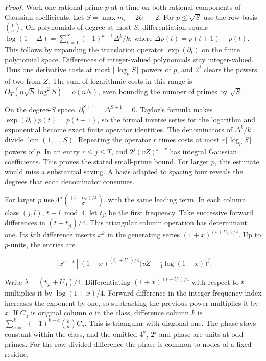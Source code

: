 \documentclass[11pt,a4paper]{article}
\begin{document}
\emph{Proof.} Work one rational prime \(p\) at a time on both rational components of Gaussian coefficients. Let \(S=\max m_v+2U_0+2\). For \(p\le\sqrt S\) use the row basis \(\binom t\sigma\). On polynomials of degree at most \(S\), differentiation equals \(\log(1+\Delta)=\sum_{k=1}^S(-1)^{k-1}\Delta^k/k\), where \(\Delta p(t)=p(t+1)-p(t)\). This follows by expanding the translation operator \(\exp(\partial_t)\) on the finite polynomial space. Differences of integer-valued polynomials stay integer-valued. Thus one derivative costs at most \(\lfloor\log_p S\rfloor\) powers of \(p\), and \(2^j\) clears the powers of two from \(Z\). The sum of logarithmic costs in this range is \(O_T(n\sqrt S\log^2 S)=o(nN)\), even bounding the number of primes by \(\sqrt S\).

On the degree-\(S\) space, \(\partial_t^{S+1}=\Delta^{S+1}=0\). Taylor's formula makes \(\exp(\partial_t)p(t)=p(t+1)\), so the formal inverse series for the logarithm and exponential become exact finite operator identities. The denominators of \(\Delta^k/k\) divide \(\operatorname{lcm}(1,\ldots,S)\). Repeating the operator \(r\) times costs at most \(r\lfloor\log_p S\rfloor\) powers of \(p\). In an entry \(r\le j\le T\), and \(2^j(vZ)^{j-r}\) has integral Gaussian coefficients. This proves the stated small-prime bound. For larger \(p\), this estimate would miss a substantial saving. A basis adapted to spacing four reveals the degrees that each denominator consumes.

For larger \(p\) use \(4^\sigma\binom{(t+U_0)/4}{\sigma}\), with the same leading term. In each column class \((j,l)\), \(t\equiv l\bmod4\), let \(t_{jl}\) be the first frequency. Take successive forward differences in \((t-t_{jl})/4\). This triangular column operation has determinant one. Its \(k\)th difference inserts \(x^k\) in the generating series \((1+x)^{(t+U_0)/4}\). Up to \(p\)-units, the entries are

\[
 [x^{\sigma-k}](1+x)^{(t_{jl}+U_0)/4}
        \big(vZ+\tfrac14\log(1+x)\big)^j .                               \tag{10}\label{eq:10}
\]

Write \(\lambda=(t_{jl}+U_0)/4\). Differentiating \((1+x)^{(t+U_0)/4}\) with respect to \(t\) multiplies it by \(\log(1+x)/4\). Forward difference in the integer frequency index increases the exponent by one, so subtracting the previous power multiplies it by \(x\). If \(C_a\) is original column \(a\) in the class, difference column \(k\) is \(\sum_{a=0}^k(-1)^{k-a}\binom ka C_a\). This is triangular with diagonal one. The phase stays constant within the class, and the omitted \(4^\sigma\), \(2^j\) and phase are units at odd primes. For the row divided difference the phase is common to nodes of a fixed residue.
\end{document}
